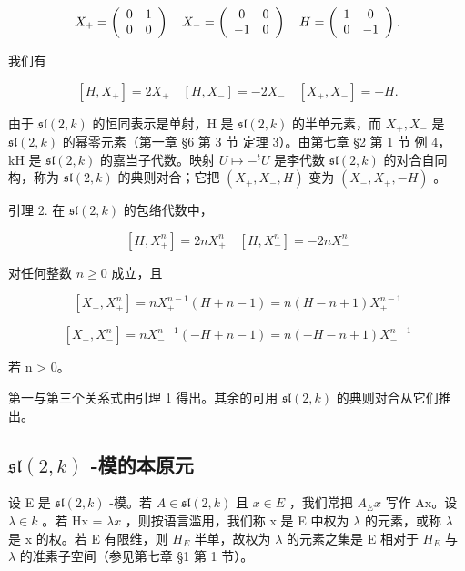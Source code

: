 \[
X _ {+} = \left( \begin{array}{c c} 0 & 1 \\ 0 & 0 \end{array} \right) \quad X _ {-} = \left( \begin{array}{c c} 0 & 0 \\ - 1 & 0 \end{array} \right) \quad H = \left( \begin{array}{c c} 1 & 0 \\ 0 & - 1 \end{array} \right).
\]

我们有

\[
[ H, X _ {+} ] = 2 X _ {+} \quad [ H, X _ {-} ] = - 2 X _ {-} \quad [ X _ {+}, X _ {-} ] = - H.\tag{1}
\]

由于 \(\mathfrak{sl}(2,k)\) 的恒同表示是单射，H 是 \(\mathfrak{sl}(2,k)\) 的半单元素，而 \(X_{+}, X_{-}\) 是 \(\mathfrak{sl}(2,k)\) 的幂零元素（第一章 §6 第 3 节 定理 3）。由第七章 §2 第 1 节 例 4，kH 是 \(\mathfrak{sl}(2,k)\) 的嘉当子代数。映射 \(U \mapsto -^{t}U\) 是李代数 \(\mathfrak{sl}(2,k)\) 的对合自同构，称为 \(\mathfrak{sl}(2,k)\) 的典则对合；它把 \((X_{+}, X_{-}, H)\) 变为 \((X_{-}, X_{+}, -H)\) 。

引理 2. 在 \(\mathfrak{sl}(2,k)\) 的包络代数中，

\[
[ H, X _ {+} ^ {n} ] = 2 n X _ {+} ^ {n} \quad [ H, X _ {-} ^ {n} ] = - 2 n X _ {-} ^ {n}
\]

对任何整数 \(n \geq 0\) 成立，且

\[
[ X _ {-}, X _ {+} ^ {n} ] = n X _ {+} ^ {n - 1} (H + n - 1) = n (H - n + 1) X _ {+} ^ {n - 1}
\]

\[
[ X _ {+}, X _ {-} ^ {n} ] = n X _ {-} ^ {n - 1} (- H + n - 1) = n (- H - n + 1) X _ {-} ^ {n - 1}
\]

若 n \textgreater{} 0。

第一与第三个关系式由引理 1 得出。其余的可用 \(\mathfrak{sl}(2,k)\) 的典则对合从它们推出。

\subsection{\texorpdfstring{\(\mathfrak{sl}(2,k)\) -模的本原元}{\textbackslash mathfrak\{sl\}(2,k) -模的本原元}}

设 E 是 \(\mathfrak{sl}(2,k)\) -模。若 \(A \in \mathfrak{sl}(2,k)\) 且 \(x \in E\) ，我们常把 \(A_{E}x\) 写作 Ax。设 \(\lambda \in k\) 。若 Hx = \(\lambda x\) ，则按语言滥用，我们称 x 是 E 中权为 \(\lambda\) 的元素，或称 \(\lambda\) 是 x 的权。若 E 有限维，则 \(H_{E}\) 半单，故权为 \(\lambda\) 的元素之集是 E 相对于 \(H_{E}\) 与 \(\lambda\) 的准素子空间（参见第七章 §1 第 1 节）。

